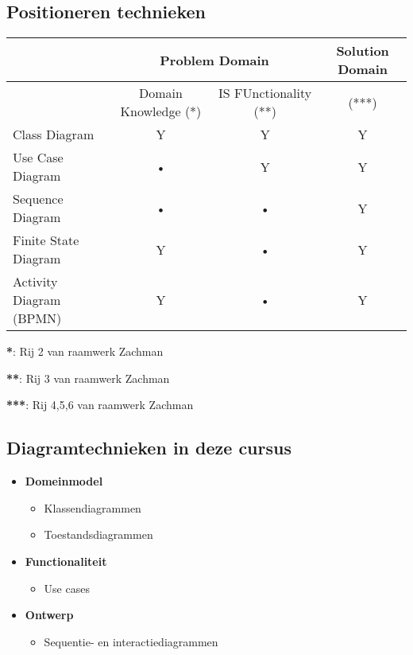 \documentclass[../../main.tex]{subfiles}
\begin{document}
\subsection{Positioneren technieken}
\begin{tabular}{|l|c|c|c|}
\hline
 & \multicolumn{2}{c|}{Problem Domain} & Solution Domain \\
\hline
 & Domain Knowledge (*) & IS FUnctionality (**) & (***) \\
\hline
Class Diagram & Y & Y & Y \\
\hline
Use Case Diagram & • & Y & Y \\
\hline
Sequence Diagram & • & • & Y \\
\hline
Finite State Diagram & Y & • & Y \\
\hline
Activity Diagram (BPMN) & Y & • & Y \\
\hline
\end{tabular}
\begin{description}
	\item \textbf{*}: Rij 2 van raamwerk Zachman
	\item \textbf{**}: Rij 3 van raamwerk Zachman
	\item \textbf{***}: Rij 4,5,6 van raamwerk Zachman
\end{description}
\subsection{Diagramtechnieken in deze cursus}
\begin{itemize}
	\item \textbf{Domeinmodel}
	\begin{itemize}
		\item Klassendiagrammen
		\item Toestandsdiagrammen
	\end{itemize}
	\item \textbf{Functionaliteit}
	\begin{itemize}
		\item Use cases
	\end{itemize}
	\item \textbf{Ontwerp}
	\begin{itemize}
		\item Sequentie- en interactiediagrammen
	\end{itemize}
\end{itemize}
\end{document}
